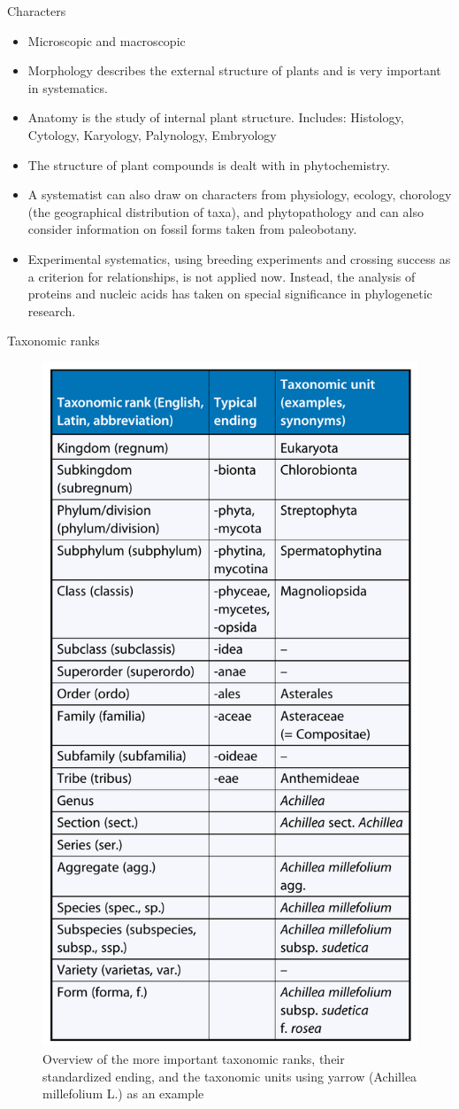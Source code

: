 \documentclass[ignorenonframetext,aspectratio=169]{beamer}
\providecommand{\tightlist}{%
  \setlength{\itemsep}{0pt}\setlength{\parskip}{0pt}}
\begin{document}
\begin{frame}{Characters}
\protect\hypertarget{characters}{}

\begin{itemize}
\tightlist
\item
  Microscopic and macroscopic
\item
  Morphology describes the external structure of plants and is very
  important in systematics.
\item
  Anatomy is the study of internal plant structure. Includes: Histology,
  Cytology, Karyology, Palynology, Embryology
\item
  The structure of plant compounds is dealt with in phytochemistry.
\item
  A systematist can also draw on characters from physiology, ecology,
  chorology (the geographical distribution of taxa), and phytopathology
  and can also consider information on fossil forms taken from
  paleobotany.
\item
  Experimental systematics, using breeding experiments and crossing
  success as a criterion for relationships, is not applied now. Instead,
  the analysis of proteins and nucleic acids has taken on special
  significance in phylogenetic research.
\end{itemize}

\end{frame}

\begin{frame}{Taxonomic ranks}
\protect\hypertarget{taxonomic-ranks}{}

\begin{figure}
\includegraphics[width=0.25\linewidth]{./../images/taxonomic_rank_yarrow} \caption{Overview of the more important taxonomic ranks, their standardized ending, and the taxonomic units using yarrow (Achillea millefolium L.) as an example}\label{fig:taxonomic-ranks}
\end{figure}

\end{frame}
\end{document}
